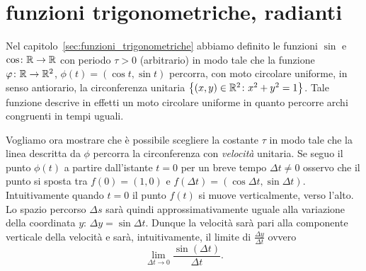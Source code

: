 
\section{funzioni trigonometriche, radianti}

Nel capitolo~\ref{sec:funzioni_trigonometriche} abbiamo definito le 
funzioni $\sin$ e $\cos\colon {\mathbb R}\to {\mathbb R}$ con periodo $\tau>0$ (arbitrario)
in modo tale che la funzione $\varphi\colon {\mathbb R}\to{\mathbb R}^2$, $\phi(t)=(\cos t, \sin t)$ 
percorra, con moto circolare uniforme, in senso antiorario, la circonferenza 
unitaria ${\left\{ (x,y)\in {\mathbb R}^2\colon x^2+y^2=1 \right\}}$.
Tale funzione descrive in effetti un moto circolare uniforme 
in quanto percorre archi congruenti in tempi uguali.

Vogliamo ora mostrare che è possibile scegliere la costante $\tau$
in modo tale che la linea descritta da $\phi$ percorra la circonferenza 
con \emph{velocità} unitaria.
%
Se seguo il punto $\phi(t)$ a partire dall'istante $t=0$ per un breve tempo 
$\Delta t\neq 0$
osservo che il punto si sposta tra $f(0) = (1,0)$ e 
$f(\Delta t) = (\cos \Delta t, \sin \Delta t)$.
%
Intuitivamente quando $t=0$ il punto $f(t)$ si muove verticalmente, 
verso l'alto. 
Lo spazio percorso $\Delta s$ sarà quindi approssimativamente 
uguale alla variazione della coordinata $y$: 
$\Delta y = \sin \Delta t$.
Dunque la velocità sarà pari alla componente verticale della velocità 
e sarà, intuitivamente, il limite di $\frac{\Delta y}{\Delta t}$ ovvero 
\[
\lim_{\Delta t\to 0} \frac{\sin(\Delta t)}{\Delta t}.  
\]

